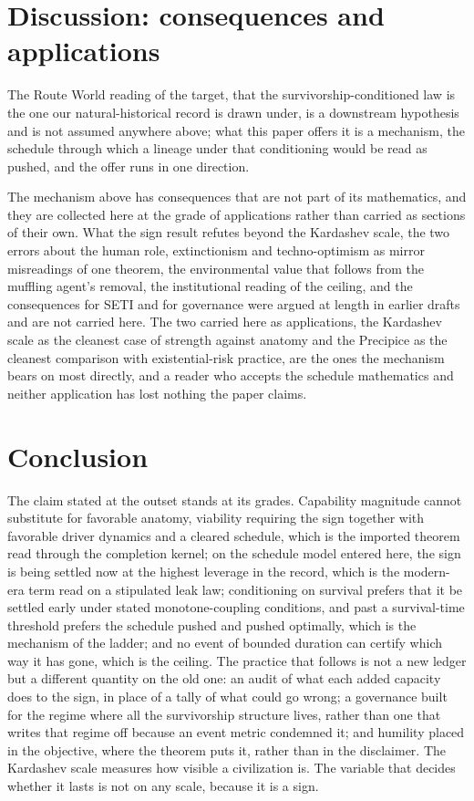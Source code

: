 \documentclass[11pt]{article}
\theoremstyle{plain}
\theoremstyle{definition}
\theoremstyle{remark}
\begin{document}
\section{Discussion: consequences and applications}\label{sec:discussion}

The Route World reading of the target, that the survivorship-conditioned
law is the one our natural-historical record is drawn under, is a
downstream hypothesis and is not assumed anywhere above; what this
paper offers it is a mechanism, the schedule through which a lineage
under that conditioning would be read as pushed, and the offer runs in
one direction.

The mechanism above has consequences that are not part of its
mathematics, and they are collected here at the grade of applications
rather than carried as sections of their own. What the sign result
refutes beyond the Kardashev scale, the two errors about the human role,
extinctionism and techno-optimism as mirror misreadings of one theorem,
the environmental value that follows from the muffling agent's removal,
the institutional reading of the ceiling, and the consequences for SETI
and for governance were argued at length in earlier drafts and are
not carried here. The two carried
here as applications, the Kardashev scale as the cleanest case of
strength against anatomy and the Precipice as the cleanest comparison
with existential-risk practice, are the ones the mechanism bears on most
directly, and a reader who accepts the schedule mathematics and neither
application has lost nothing the paper claims.

\section{Conclusion}\label{sec:conclusion}

The claim stated at the outset stands at its grades. Capability
magnitude cannot substitute for favorable anatomy, viability requiring
the sign together with favorable driver dynamics and a cleared
schedule, which is the imported theorem read through the completion
kernel; on the schedule model entered here, the sign is being settled
now at the highest leverage in the record, which is the modern-era term
read on a stipulated leak law; conditioning on survival prefers that it
be settled early under stated monotone-coupling conditions, and past a
survival-time threshold prefers the schedule pushed and pushed
optimally, which is the mechanism of the ladder; and no event of bounded
duration can certify which way it has gone, which is the ceiling. The
practice that follows is not a new ledger but a different quantity on
the old one: an audit of what each added capacity does to the sign, in
place of a tally of what could go wrong; a governance built for the
regime where all the survivorship structure lives, rather than one that
writes that regime off because an event metric condemned it; and
humility placed in the objective, where the theorem puts it, rather than
in the disclaimer. The Kardashev scale measures how visible a
civilization is. The variable that decides whether it lasts is not on
any scale, because it is a sign.
\end{document}
